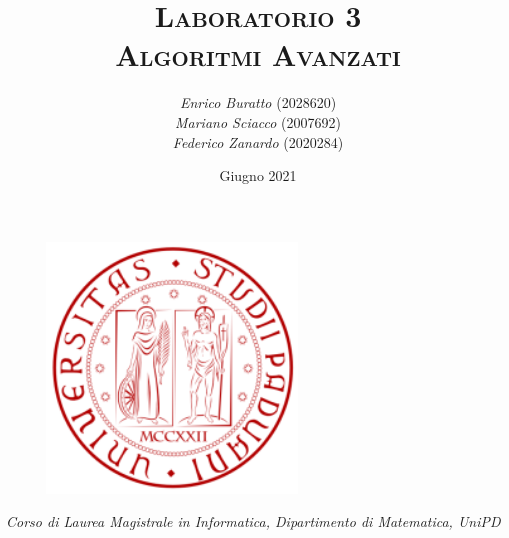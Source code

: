 \documentclass[12pt]{article}
\title{ \huge\textsc{Laboratorio 3} \\
		\large\textsc{Algoritmi Avanzati}}
\author{\textit{Enrico Buratto} (2028620)\\ 
        \textit{Mariano Sciacco} (2007692)\\
        \textit{Federico Zanardo} (2020284)}
\date{\small Giugno 2021}
\renewcommand{\baselinestretch}{1.075}
\newcommand{\hr}{\par\vspace{-.1\ht\strutbox}\noindent\hrulefill\par}
\begin{document}
 

\begin{figure}[t!]
    \centering
    \includegraphics[height=18em]{res/images/logo.png}
\end{figure}

\maketitle 
\thispagestyle{empty}

\begin{center}
    \vspace{12em}
    \hr
    \textit{Corso di Laurea Magistrale in Informatica, Dipartimento di Matematica, UniPD}
\end{center}

\newpage
\renewcommand{\baselinestretch}{0.95}\normalsize
\tableofcontents
\renewcommand{\baselinestretch}{1.075}\normalsize

\newpage

\end{document}
